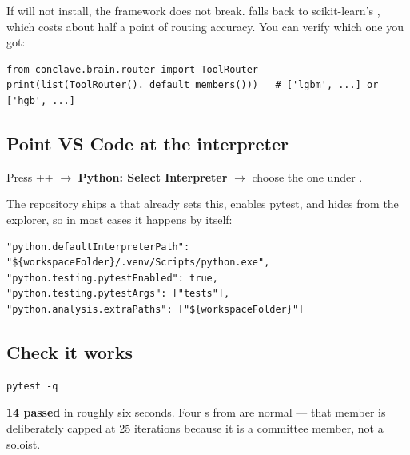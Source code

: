 \begin{okbox}
If  will not install, the framework does not break. 
falls back to scikit-learn's , which costs
about half a point of routing accuracy. You can verify which one you got:
\begin{lstlisting}[style=py]
from conclave.brain.router import ToolRouter
print(list(ToolRouter()._default_members()))   # ['lgbm', ...] or ['hgb', ...]
\end{lstlisting}
\end{okbox}

\subsection{Point VS Code at the interpreter}

Press ++ $\rightarrow$ \textbf{Python: Select
Interpreter} $\rightarrow$ choose the one under .

The repository ships a  that already sets this,
enables pytest, and hides  from the explorer, so in most
cases it happens by itself:

\begin{codebox}
\begin{lstlisting}[style=shell]
"python.defaultInterpreterPath": "${workspaceFolder}/.venv/Scripts/python.exe",
"python.testing.pytestEnabled": true,
"python.testing.pytestArgs": ["tests"],
"python.analysis.extraPaths": ["${workspaceFolder}"]
\end{lstlisting}
\end{codebox}

\subsection{Check it works}

\begin{codebox}[PowerShell]
\begin{lstlisting}[style=shell]
pytest -q
\end{lstlisting}
\end{codebox}

\begin{okbox}[Expected]
\textbf{14 passed} in roughly six seconds. Four s from
 are normal --- that member is deliberately capped at 25
iterations because it is a committee member, not a soloist.
\end{okbox}

